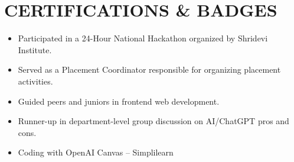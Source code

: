 \documentclass[9.5pt,a4paper]{extarticle}
\begin{document}
\section*{CERTIFICATIONS \& BADGES}
\begin{itemize}[leftmargin=0.2in, itemsep=1pt, topsep=1pt]
    \item Participated in a 24-Hour National Hackathon organized by Shridevi Institute.
    \item Served as a Placement Coordinator responsible for organizing placement activities.
    \item Guided peers and juniors in frontend web development.
    \item Runner-up in department-level group discussion on AI/ChatGPT pros and cons.
    \item Coding with OpenAI Canvas – Simplilearn
\end{itemize}
\end{document}
